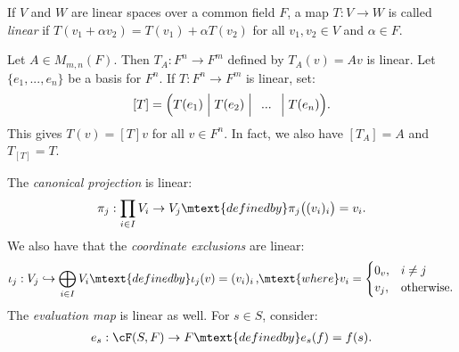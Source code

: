     \begin{definition}
        If $V$ and $W$ are linear spaces over a common field $F$, a map $T:V \rightarrow W$ is called \textit{linear} if $T(v_1 + \alpha v_2) = T(v_1) + \alpha T(v_2)$ for all $v_1,v_2 \in V$ and $\alpha \in F$.
    \end{definition}
    
    \begin{example}
        Let $A \in M_{m,n}(F)$. Then $T_A:F^n \rightarrow F^m$ defined by $T_A(v) = Av$ is linear. Let $\{e_1,...,e_n\}$ be a basis for $F^n$. If $T:F^n \rightarrow F^m$ is linear, set:
            \begin{equation*}
            \begin{split}
                [T] = \Bigl( T(e_1) \Bigm\vert T(e_2) \Bigm\vert \hspace{4.5pt}...\hspace{4.5pt}\Bigm\vert T(e_n) \Bigr).
            \end{split}
            \end{equation*}
        This gives $T(v) = [T]v$ for all $v \in F^n$. In fact, we also have $[T_A] = A$ and $T_{[T]} = T$.
    \end{example}

    \begin{example}
        The \textit{canonical projection} is linear:
            \begin{equation*}
            \begin{split}
                \pi_j: \prod_{i \in I}V_i \rightarrow V_j \mtext{defined by} \pi_j\bigl((v_i)_i\bigr) = v_i.
            \end{split}
            \end{equation*}
        We also have that the \textit{coordinate exclusions} are linear:
            \begin{equation*}
            \begin{split}
                \iota_j: V_j \hookrightarrow \bigoplus_{i \in I}V_i \mtext{defined by} \iota_j(v) = (v_i)_i \hspace{1.5pt}, \hspace{-2pt}\mtext{where} v_i = \begin{cases}
                    0_v, &i \neq j \\
                    v_j, &\text{otherwise}.
                \end{cases}
            \end{split}
            \end{equation*}
        The \textit{evaluation map} is linear as well. For $s \in S$, consider:
            \begin{equation*}
            \begin{split}
                e_s : \cF(S,F) \rightarrow F \mtext{defined by} e_s(f) = f(s).
            \end{split}
            \end{equation*}
    \end{example}

